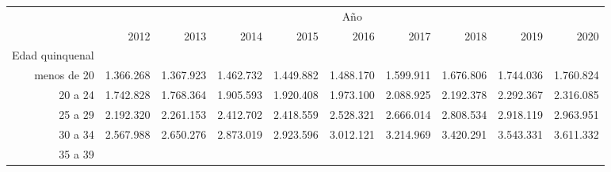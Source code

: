 \begin{tabular}{llllllllll}
\cline{1-10}
\multicolumn{1}{c}{} &
  \multicolumn{9}{|c}{Año} \\
\multicolumn{1}{c}{} &
  \multicolumn{1}{|r}{2012} &
  \multicolumn{1}{r}{2013} &
  \multicolumn{1}{r}{2014} &
  \multicolumn{1}{r}{2015} &
  \multicolumn{1}{r}{2016} &
  \multicolumn{1}{r}{2017} &
  \multicolumn{1}{r}{2018} &
  \multicolumn{1}{r}{2019} &
  \multicolumn{1}{r}{2020} \\
\cline{1-10}
\multicolumn{1}{r}{Edad quinquenal} &
  \multicolumn{1}{|r}{} &
  \multicolumn{1}{r}{} &
  \multicolumn{1}{r}{} &
  \multicolumn{1}{r}{} &
  \multicolumn{1}{r}{} &
  \multicolumn{1}{r}{} &
  \multicolumn{1}{r}{} &
  \multicolumn{1}{r}{} &
  \multicolumn{1}{r}{} \\
\multicolumn{1}{r}{menos de 20\hspace{1em}} &
  \multicolumn{1}{|r}{1.366.268} &
  \multicolumn{1}{r}{1.367.923} &
  \multicolumn{1}{r}{1.462.732} &
  \multicolumn{1}{r}{1.449.882} &
  \multicolumn{1}{r}{1.488.170} &
  \multicolumn{1}{r}{1.599.911} &
  \multicolumn{1}{r}{1.676.806} &
  \multicolumn{1}{r}{1.744.036} &
  \multicolumn{1}{r}{1.760.824} \\
\multicolumn{1}{r}{20 a 24\hspace{1em}} &
  \multicolumn{1}{|r}{1.742.828} &
  \multicolumn{1}{r}{1.768.364} &
  \multicolumn{1}{r}{1.905.593} &
  \multicolumn{1}{r}{1.920.408} &
  \multicolumn{1}{r}{1.973.100} &
  \multicolumn{1}{r}{2.088.925} &
  \multicolumn{1}{r}{2.192.378} &
  \multicolumn{1}{r}{2.292.367} &
  \multicolumn{1}{r}{2.316.085} \\
\multicolumn{1}{r}{25 a 29\hspace{1em}} &
  \multicolumn{1}{|r}{2.192.320} &
  \multicolumn{1}{r}{2.261.153} &
  \multicolumn{1}{r}{2.412.702} &
  \multicolumn{1}{r}{2.418.559} &
  \multicolumn{1}{r}{2.528.321} &
  \multicolumn{1}{r}{2.666.014} &
  \multicolumn{1}{r}{2.808.534} &
  \multicolumn{1}{r}{2.918.119} &
  \multicolumn{1}{r}{2.963.951} \\
\multicolumn{1}{r}{30 a 34\hspace{1em}} &
  \multicolumn{1}{|r}{2.567.988} &
  \multicolumn{1}{r}{2.650.276} &
  \multicolumn{1}{r}{2.873.019} &
  \multicolumn{1}{r}{2.923.596} &
  \multicolumn{1}{r}{3.012.121} &
  \multicolumn{1}{r}{3.214.969} &
  \multicolumn{1}{r}{3.420.291} &
  \multicolumn{1}{r}{3.543.331} &
  \multicolumn{1}{r}{3.611.332} \\
\multicolumn{1}{r}{35 a 39\hspace{1em}} &

\end{tabular}
